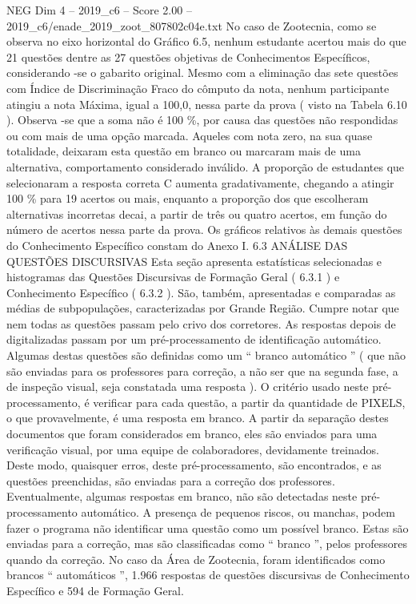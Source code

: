 \begin{textsample}{NEG Dim 4 – 2019\_c6 – Score 2.00 – 2019\_c6/enade\_2019\_zoot\_807802c04e.txt}
No caso de Zootecnia, como se observa no eixo horizontal do Gráfico 6.5, nenhum estudante acertou mais do que 21 questões dentre as 27 questões objetivas de Conhecimentos Específicos, considerando -se o gabarito original.
Mesmo com a eliminação das sete questões com Índice de Discriminação Fraco do cômputo da nota, nenhum participante atingiu a nota Máxima, igual a 100,0, nessa parte da prova ( visto na Tabela 6.10 ).
Observa -se que a soma não é 100 \%, por causa das questões não respondidas ou com mais de uma opção marcada.
Aqueles com nota zero, na sua quase totalidade, deixaram esta questão em branco ou marcaram mais de uma alternativa, comportamento considerado inválido.
A proporção de estudantes que selecionaram a resposta correta C aumenta gradativamente, chegando a atingir 100 \% para 19 acertos ou mais, enquanto a proporção dos que escolheram alternativas incorretas decai, a partir de três ou quatro acertos, em função do número de acertos nessa parte da prova.
Os gráficos relativos às demais questões do Conhecimento Específico constam do Anexo I. 6.3 ANÁLISE DAS QUESTÕES DISCURSIVAS Esta seção apresenta estatísticas selecionadas e histogramas das Questões Discursivas de Formação Geral ( 6.3.1 ) e Conhecimento Específico ( 6.3.2 ).
São, também, apresentadas e comparadas as médias de subpopulações, caracterizadas por Grande Região.
Cumpre notar que nem todas as questões passam pelo crivo dos corretores.
As respostas depois de digitalizadas passam por um pré-processamento de identificação automático.
Algumas destas questões são definidas como um “ branco automático ” ( que não são enviadas para os professores para correção, a não ser que na segunda fase, a de inspeção visual, seja constatada uma resposta ).
O critério usado neste pré-processamento, é verificar para cada questão, a partir da quantidade de PIXELS, o que provavelmente, é uma resposta em branco.
A partir da separação destes documentos que foram considerados em branco, eles são enviados para uma verificação visual, por uma equipe de colaboradores, devidamente treinados.
Deste modo, quaisquer erros, deste pré-processamento, são encontrados, e as questões preenchidas, são enviadas para a correção dos professores.
Eventualmente, algumas respostas em branco, não são detectadas neste pré-processamento automático.
A presença de pequenos riscos, ou manchas, podem fazer o programa não identificar uma questão como um possível branco.
Estas são enviadas para a correção, mas são classificadas como “ branco ”, pelos professores quando da correção.
No caso da Área de Zootecnia, foram identificados como brancos “ automáticos ”, 1.966 respostas de questões discursivas de Conhecimento Específico e 594 de Formação Geral.

\end{textsample}
